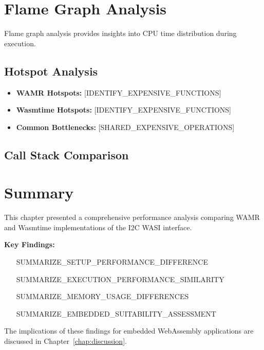 \section{Flame Graph Analysis}
\label{sec:flamegraph-analysis}

Flame graph analysis provides insights into CPU time distribution during execution.



\subsection{Hotspot Analysis}

\begin{itemize}
    \item \textbf{WAMR Hotspots:} [IDENTIFY\_EXPENSIVE\_FUNCTIONS]
    \item \textbf{Wasmtime Hotspots:} [IDENTIFY\_EXPENSIVE\_FUNCTIONS]
    \item \textbf{Common Bottlenecks:} [SHARED\_EXPENSIVE\_OPERATIONS]
\end{itemize}

\subsection{Call Stack Comparison}


\section{Summary}
\label{sec:performance-summary}

This chapter presented a comprehensive performance analysis comparing WAMR and Wasmtime implementations of the I2C WASI interface.

\textbf{Key Findings:}
\begin{itemize}
    \item [SUMMARIZE\_SETUP\_PERFORMANCE\_DIFFERENCE]
    \item [SUMMARIZE\_EXECUTION\_PERFORMANCE\_SIMILARITY]
    \item [SUMMARIZE\_MEMORY\_USAGE\_DIFFERENCES] 
    \item [SUMMARIZE\_EMBEDDED\_SUITABILITY\_ASSESSMENT]
\end{itemize}

The implications of these findings for embedded WebAssembly applications are discussed in Chapter~\ref{chap:discussion}.